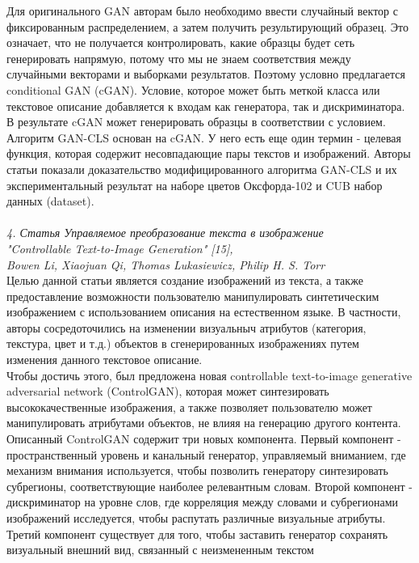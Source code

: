 \documentclass{article}
\begin{document}
    Для оригинального GAN авторам было необходимо ввести случайный вектор с фиксированным распределением, а затем получить результирующий образец. Это означает, что не получается контролировать, какие образцы будет сеть генерировать напрямую, потому что мы не знаем соответствия между случайными векторами и выборками результатов. Поэтому условно предлагается conditional GAN (cGAN). Условие, которое может быть меткой класса или текстовое описание добавляется к входам как генератора, так и дискриминатора. В результате cGAN может генерировать образцы в соответствии с условием. 
    \\
    Алгоритм GAN-CLS основан на cGAN. У него есть еще один термин - целевая функция, которая содержит несовпадающие пары текстов и изображений. Авторы статьи показали доказательство модифицированного алгоритма GAN-CLS и их экспериментальный результат на наборе цветов Оксфорда-102 и CUB набор данных (dataset).
    \\ \\
    \textit{4. Статья Управляемое преобразование текста в изображение
    \\
    "Controllable Text-to-Image Generation" [15],
    \\
    Bowen Li, Xiaojuan Qi, Thomas Lukasiewicz, Philip H. S. Torr}
    \\

    Целью данной статьи является создание изображений из текста, а также предоставление возможности пользователю манипулировать синтетическим изображением с использованием описания на естественном языке. В частности, авторы сосредоточились на изменении визуальныч атрибутов (категория, текстура, цвет и т.д.) объектов в сгенерированных изображениях путем изменения данного текстовое описание. 
    \\
    Чтобы достичь этого, был предложена новая controllable text-to-image generative adversarial network (ControlGAN), которая может синтезировать высококачественные изображения, а также позволяет пользователю может манипулировать атрибутами объектов, не влияя на генерацию другого контента. 
    \\
    Описанный ControlGAN содержит три новых компонента. Первый компонент - пространственный уровень и канальный генератор, управляемый вниманием, где механизм внимания используется, чтобы позволить генератору синтезировать субрегионы, соответствующие наиболее релевантным словам. Второй компонент - дискриминатор на уровне слов, где корреляция между словами и субрегионами изображений исследуется, чтобы распутать различные визуальные атрибуты. Третий компонент существует для того, чтобы заставить генератор сохранять визуальный внешний вид, связанный с неизмененным текстом
    
\end{document}
